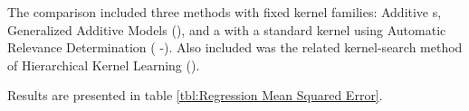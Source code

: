 \footnotetext{
In one dimension, the predictive means of all baseline methods in table \ref{tbl:Regression Mean Squared Error} are identical to that of a \gp{} with an $\kSE{}$ kernel.}



The comparison included three methods with fixed kernel families: Additive \gp{}s, Generalized Additive Models (\GAM{}), and a \gp{} with a standard \kSE{} kernel using Automatic Relevance Determination (\gp{} \kSE{}-\ARD{}).  Also included was the related kernel-search method of Hierarchical Kernel Learning (\HKL{}).

Results are presented in table \ref{tbl:Regression Mean Squared Error}.
%

